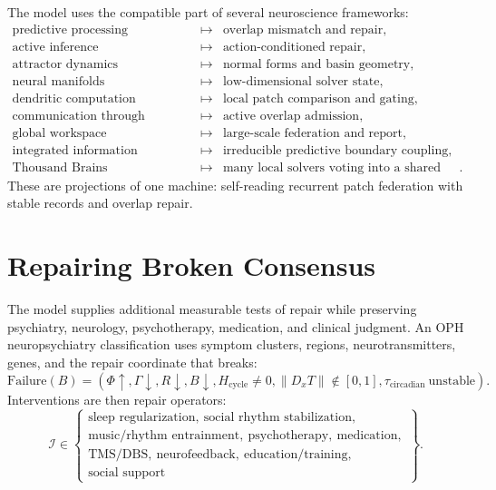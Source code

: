 \documentclass[11pt]{article}
\theoremstyle{remark}
\theoremstyle{plain}
\begin{document}
The model uses the compatible part of several neuroscience frameworks:
\[
\begin{array}{rcl}
\text{predictive processing} &\mapsto& \text{overlap mismatch and repair},\\
\text{active inference} &\mapsto& \text{action-conditioned repair},\\
\text{attractor dynamics} &\mapsto& \text{normal forms and basin geometry},\\
\text{neural manifolds} &\mapsto& \text{low-dimensional solver state},\\
\text{dendritic computation} &\mapsto& \text{local patch comparison and gating},\\
\text{communication through coherence} &\mapsto& \text{active overlap admission},\\
\text{global workspace} &\mapsto& \text{large-scale federation and report},\\
\text{integrated information} &\mapsto& \text{irreducible predictive boundary coupling},\\
\text{Thousand Brains} &\mapsto& \text{many local solvers voting into a shared model}.
\end{array}
\]
These are projections of one machine: self-reading recurrent patch federation with stable records and overlap repair.

\section{Repairing Broken Consensus}

The model supplies additional measurable tests of repair while preserving
psychiatry, neurology, psychotherapy, medication, and clinical judgment. An
OPH neuropsychiatry classification uses symptom clusters, regions,
neurotransmitters, genes, and the repair coordinate that breaks:
\[
\boxed{
\mathrm{Failure}(B)
=
(
\Phi\uparrow,
\Gamma\downarrow,
R\downarrow,
B\downarrow,
H_{\mathrm{cycle}}\ne0,
\|D_xT\|\notin[0,1],
\tau_{\mathrm{circadian}}\ \mathrm{unstable}
).
}
\]
Interventions are then repair operators:
\[
\mathcal I
\in
\left\{
\begin{array}{l}
\text{sleep regularization},\ \text{social rhythm stabilization},\\
\text{music/rhythm entrainment},\ \text{psychotherapy},\ \text{medication},\\
\text{TMS/DBS},\ \text{neurofeedback},\ \text{education/training},\\
\text{social support}
\end{array}
\right\}.
\]
\end{document}
